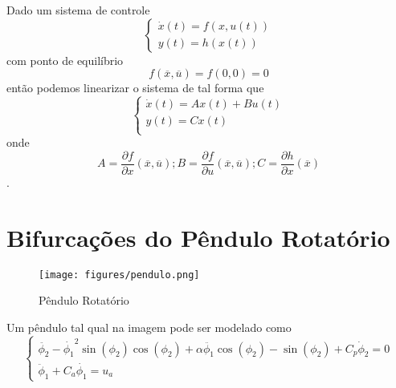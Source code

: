 Dado um sistema de controle \[
    \begin{cases}
	\dot{x}(t)=f(x,u(t)) \\
	y(t)=h(x(t))
    \end{cases}
\] com ponto de equilíbrio \[
 f(\overline{x},\overline{u})=f(0,0)=0
\] então podemos linearizar o sistema de tal forma que \[
\begin{cases}
\dot{x}(t) = Ax(t) + Bu(t) \\
y(t) = Cx(t) \\
\end{cases}
\]  onde \[
A = \frac{\partial f}{\partial x} (\overline{x},\overline{u}); B = \frac{\partial f}{\partial u} (\overline{x},\overline{u}) ; C = \frac{\partial h}{\partial x} (\overline{x})
\].

\section*{Bifurcações do Pêndulo Rotatório}

\begin{figure}[H]
    \centering
    \texttt{[image: figures/pendulo.png]}
    \caption{Pêndulo Rotatório}
    \label{fig:figures-pendulo-png}
\end{figure}

Um pêndulo tal qual na imagem pode ser modelado como \[
\begin{cases}
    \ddot{\phi_2} - \dot{\phi_1}^{2}\sin(\phi_2)\cos(\phi_2) + \alpha\ddot{\phi_1}\cos(\phi_2) - \sin(\phi_2) + C_p \dot{\phi}_2 = 0 \\
    \ddot{\phi}_1 + C_a \dot{\phi_1} = u_a
\end{cases}
\] 

